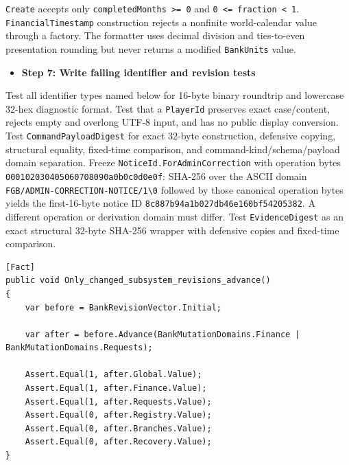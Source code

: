 \documentclass[
  10pt,
  letterpaper,
]{article}
\newcommand{\passthrough}[1]{#1}
\providecommand{\tightlist}{%
  \setlength{\itemsep}{0pt}\setlength{\parskip}{0pt}}
\begin{document}
\passthrough{\lstinline!Create!} accepts only
\passthrough{\lstinline!completedMonths >= 0!} and
\passthrough{\lstinline!0 <= fraction < 1!}.
\passthrough{\lstinline!FinancialTimestamp!} construction rejects a
nonfinite world-calendar value through a factory. The formatter uses
decimal division and ties-to-even presentation rounding but never
returns a modified \passthrough{\lstinline!BankUnits!} value.

\begin{itemize}
\tightlist
\item[$\square$]
  \textbf{Step 7: Write failing identifier and revision tests}
\end{itemize}

Test all identifier types named below for 16-byte binary roundtrip and
lowercase 32-hex diagnostic format. Test that a
\passthrough{\lstinline!PlayerId!} preserves exact case/content, rejects
empty and overlong UTF-8 input, and has no public display conversion.
Test \passthrough{\lstinline!CommandPayloadDigest!} for exact 32-byte
construction, defensive copying, structural equality, fixed-time
comparison, and command-kind/\allowbreak{}schema/\allowbreak{}payload
domain separation. Freeze
\texttt{NoticeId.}\allowbreak{}\texttt{ForAdminCorrection} with
operation bytes \texttt{000102030405060708090a0b0c0d0e0f}: SHA-256 over
the ASCII domain
\texttt{FGB/}\allowbreak{}\texttt{ADMIN-}\allowbreak{}\texttt{CORRECTION-}\allowbreak{}\texttt{NOTICE/}\allowbreak{}\texttt{1\textbackslash{}}\allowbreak{}\texttt{0}
followed by those canonical operation bytes yields the first-16-byte
notice ID \texttt{8c887b94a1b027db46e160bf54205382}. A different
operation or derivation domain must differ. Test
\passthrough{\lstinline!EvidenceDigest!} as an exact structural 32-byte
SHA-256 wrapper with defensive copies and fixed-time comparison.

\begin{lstlisting}
[Fact]
public void Only_changed_subsystem_revisions_advance()
{
    var before = BankRevisionVector.Initial;

    var after = before.Advance(BankMutationDomains.Finance | BankMutationDomains.Requests);

    Assert.Equal(1, after.Global.Value);
    Assert.Equal(1, after.Finance.Value);
    Assert.Equal(1, after.Requests.Value);
    Assert.Equal(0, after.Registry.Value);
    Assert.Equal(0, after.Branches.Value);
    Assert.Equal(0, after.Recovery.Value);
}
\end{lstlisting}
\end{document}
